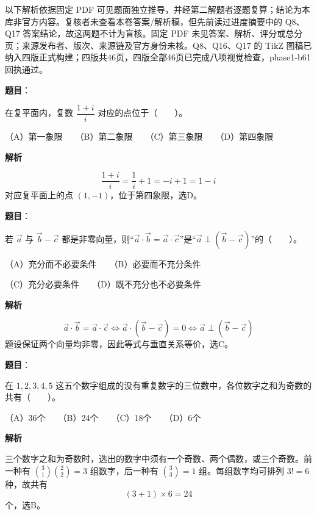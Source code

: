 

\begin{gktip}
以下解析依据固定 PDF 可见题面独立推导，并经第二解题者逐题复算；结论为本库非官方内容。复核者未查看本卷答案/解析稿，但先前读过进度摘要中的 Q8、Q17 答案结论，故这两题不计为盲核。固定 PDF 未见答案、解析、评分或总分页；来源发布者、版次、来源链及官方身份未核。Q8、Q16、Q17 的 TikZ 图稿已纳入四版正式构建；四版共46页，四版全部46页已完成八项视觉检查，phase1-b61回执通过。
\end{gktip}

\begin{answer}

\textbf{题目}：

在复平面内，复数 $\dfrac{1+i}{i}$ 对应的点位于\mbox{（　　）}。

（A）第一象限　　（B）第二象限　　（C）第三象限　　（D）第四象限

\textbf{解析}

\nopagebreak[4]
\[
\frac{1+i}{i}=\frac1i+1=-i+1=1-i
\]
对应复平面上的点 $(1,-1)$，位于第四象限，选D。


\end{answer}
\begin{answer}

\textbf{题目}：

若 $\vec a$ 与 $\vec b-\vec c$ 都是非零向量，则“$\vec a\cdot\vec b=\vec a\cdot\vec c$”是“$\vec a\perp(\vec b-\vec c)$”的\mbox{（　　）}。

（A）充分而不必要条件　　（B）必要而不充分条件

（C）充分必要条件　　（D）既不充分也不必要条件

\textbf{解析}

\nopagebreak[4]
\[
\vec a\cdot\vec b=\vec a\cdot\vec c
\iff \vec a\cdot(\vec b-\vec c)=0
\iff \vec a\perp(\vec b-\vec c)
\]
题设保证两个向量均非零，因此等式与垂直关系等价，选C。


\end{answer}
\begin{answer}

\textbf{题目}：

在 $1,2,3,4,5$ 这五个数字组成的没有重复数字的三位数中，各位数字之和为奇数的共有\mbox{（　　）}。

（A）36个　　（B）24个　　（C）18个　　（D）6个

\textbf{解析}

三个数字之和为奇数时，选出的数字中须有一个奇数、两个偶数，或三个奇数。前一种有 $\binom31\binom22=3$ 组数字，后一种有 $\binom33=1$ 组。每组数字均可排列 $3!=6$ 种，故共有
\nopagebreak[4]
\[
(3+1)\times 6=24
\]
个，选B。


\end{answer}

